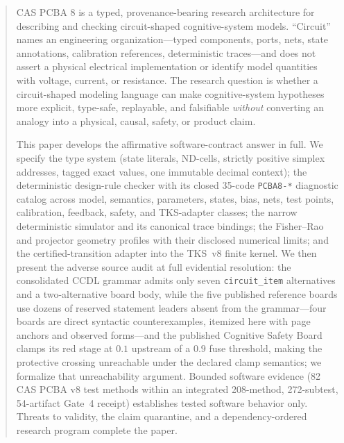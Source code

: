 \documentclass[11pt]{amsart}
\theoremstyle{definition}
\theoremstyle{remark}
\begin{document}
\begin{abstract}
CAS PCBA 8 is a typed, provenance-bearing research architecture for describing and checking circuit-shaped cognitive-system models. ``Circuit'' names an engineering organization---typed components, ports, nets, state annotations, calibration references, deterministic traces---and does not assert a physical electrical implementation or identify model quantities with voltage, current, or resistance. The research question is whether a circuit-shaped modeling language can make cognitive-system hypotheses more explicit, type-safe, replayable, and falsifiable \emph{without} converting an analogy into a physical, causal, safety, or product claim.

This paper develops the affirmative software-contract answer in full. We specify the type system (state literals, ND-cells, strictly positive simplex addresses, tagged exact values, one immutable decimal context); the deterministic design-rule checker with its closed 35-code \texttt{PCBA8-*} diagnostic catalog across model, semantics, parameters, states, bias, nets, test points, calibration, feedback, safety, and TKS-adapter classes; the narrow deterministic simulator and its canonical trace bindings; the Fisher--Rao and projector geometry profiles with their disclosed numerical limits; and the certified-transition adapter into the TKS~v8 finite kernel. We then present the adverse source audit at full evidential resolution: the consolidated CCDL grammar admits only seven \texttt{circuit\_item} alternatives and a two-alternative board body, while the five published reference boards use dozens of reserved statement leaders absent from the grammar---four boards are direct syntactic counterexamples, itemized here with page anchors and observed forms---and the published Cognitive Safety Board clamps its red stage at $0.1$ upstream of a $0.9$ fuse threshold, making the protective crossing unreachable under the declared clamp semantics; we formalize that unreachability argument. Bounded software evidence (82 CAS PCBA v8 test methods within an integrated 208-method, 272-subtest, 54-artifact Gate~4 receipt) establishes tested software behavior only. Threats to validity, the claim quarantine, and a dependency-ordered research program complete the paper.
\end{abstract}

\maketitle
\tableofcontents
\end{document}
